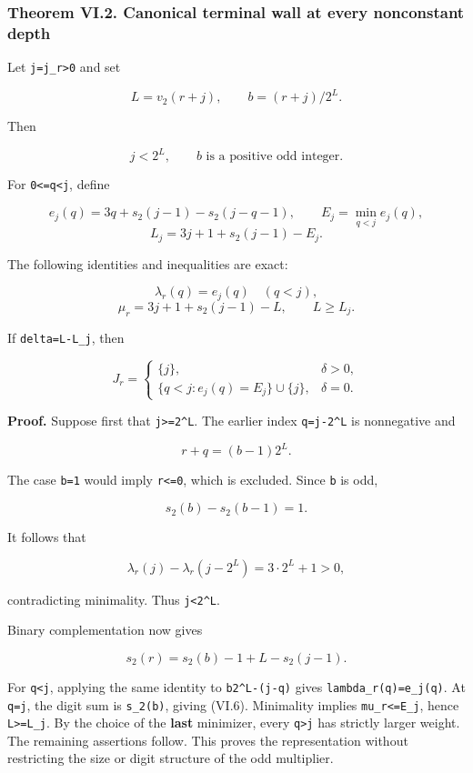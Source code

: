 \documentclass[11pt,letterpaper]{article}
\begin{document}
\subsubsection{Theorem VI.2. Canonical terminal wall at every nonconstant depth}\label{theorem-vi.2.-canonical-terminal-wall-at-every-nonconstant-depth}

Let \texttt{j=j\_r\textgreater{}0} and set

\[
L=v_2(r+j),\qquad b=(r+j)/2^L.
\]

Then

\[
\boxed{j<2^L,\qquad b\text{ is a positive odd integer}.} \tag{VI.5}
\]

For \texttt{0\textless{}=q\textless{}j}, define

\[
e_j(q)=3q+s_2(j-1)-s_2(j-q-1),\qquad
E_j=\min_{q<j}e_j(q),
\] \[
L_j=3j+1+s_2(j-1)-E_j.
\]

The following identities and inequalities are exact:

\[
\lambda_r(q)=e_j(q)\quad(q<j),
\] \[
\boxed{\mu_r=3j+1+s_2(j-1)-L,\qquad L\ge L_j.} \tag{VI.6}
\]

If \texttt{delta=L-L\_j}, then

\[
J_r=
\begin{cases}
\{j\},&\delta>0,\\
\{q<j:e_j(q)=E_j\}\cup\{j\},&\delta=0.
\end{cases} \tag{VI.7}
\]

\textbf{Proof.} Suppose first that \texttt{j\textgreater{}=2\^{}L}. The earlier index \texttt{q=j-2\^{}L} is nonnegative and

\[
r+q=(b-1)2^L.
\]

The case \texttt{b=1} would imply \texttt{r\textless{}=0}, which is excluded. Since \texttt{b} is odd,

\[
s_2(b)-s_2(b-1)=1.
\]

It follows that

\[
\lambda_r(j)-\lambda_r(j-2^L)=3\cdot2^L+1>0,
\]

contradicting minimality. Thus \texttt{j\textless{}2\^{}L}.

Binary complementation now gives

\[
s_2(r)=s_2(b)-1+L-s_2(j-1).
\]

For \texttt{q\textless{}j}, applying the same identity to \texttt{b2\^{}L-(j-q)} gives \texttt{lambda\_r(q)=e\_j(q)}. At \texttt{q=j}, the digit sum is \texttt{s\_2(b)}, giving (VI.6). Minimality implies \texttt{mu\_r\textless{}=E\_j}, hence \texttt{L\textgreater{}=L\_j}. By the choice of the \textbf{last} minimizer, every \texttt{q\textgreater{}j} has strictly larger weight. The remaining assertions follow. This proves the representation without restricting the size or digit structure of the odd multiplier.
\end{document}
